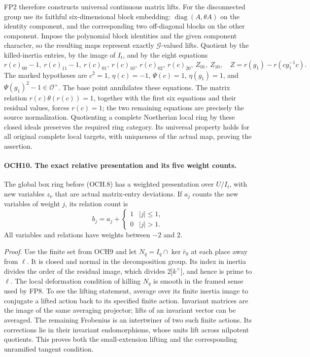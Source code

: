 \documentclass[11pt,a4paper]{article}
\numberwithin{equation}{section}
\theoremstyle{remark}\newtheorem{remark}[theorem]{Remark}
\begin{document}
FP2 therefore constructs universal continuous matrix lifts.  For the
disconnected group use its faithful six-dimensional block embedding:
\(\operatorname{diag}(A,\theta A)\) on the identity component,
and the corresponding two off-diagonal blocks on the other
component.  Impose the polynomial block identities and the given
component character, so the resulting maps represent exactly
\(\mathcal G\)-valued lifts.  Quotient by the killed-inertia
entries, by the image of \(I_t\), and by the eight equations
\[
 r(c)_{00}-1,\ r(c)_{11}-1,\ r(c)_{01},\ r(c)_{10},\
 r(c)_{02},\ r(c)_{20},\ Z_{01},\ Z_{10},
 \quad Z=r(g_1)-r(cg_1^{-1}c).
 \tag{OCH.8}
\]
The marked hypotheses are \(c^2=1\), \(\eta(c)=-1\),
\(\Psi(c)=1\), \(\eta(g_1)=1\), and
\(\Psi(g_1)^2-1\in\mathcal O^\times\).
The base point annihilates these equations.  The matrix relation
\(r(c)\theta(r(c))=1\), together with the first six equations
and their residual values, forces \(r(c)=1\); the two remaining
equations are precisely the source normalization.
Quotienting a complete Noetherian local ring by these closed ideals
preserves the required ring category.  Its universal property holds
for all original complete local targets, with uniqueness of the
actual map, proving the assertion.

\paragraph{OCH10. The exact relative presentation and its five weight counts.}
\label{claim:OCH10}
The global box ring before (OCH.8) has a weighted presentation over
\(U/I_t\), with new variables \(z_\nu\) that are actual
matrix-entry deviations.  If \(a_j\) counts the new variables
of weight \(j\), its relation count is
\[
        b_j=a_j+\begin{cases}1&|j|\le1,\\0&|j|>1.\end{cases}
 \tag{OCH.9}
\]
All variables and relations have weights between \(-2\) and \(2\).

\emph{Proof.}
Use the finite set from OCH9 and let
\(N_q=I_q\cap\ker\bar r_0\) at each place away from
\(\ell\).  It is closed and normal in the decomposition group.
Its index in inertia divides the order of the residual image,
which divides \(2|k^\times|\), and hence is prime to \(\ell\).
The local deformation condition of killing \(N_q\) is smooth
in the framed sense used by FP8.  To see the lifting statement,
average over its finite inertia image to conjugate a lifted action
back to its specified finite action.  Invariant matrices are the
image of the same averaging projector; lifts of an invariant vector
can be averaged.  The remaining Frobenius is an intertwiner of two
such finite actions.  Its corrections lie in their invariant
endomorphisms, whose units lift across nilpotent quotients.  This
proves both the small-extension lifting and the corresponding
unramified tangent condition.
\end{document}
